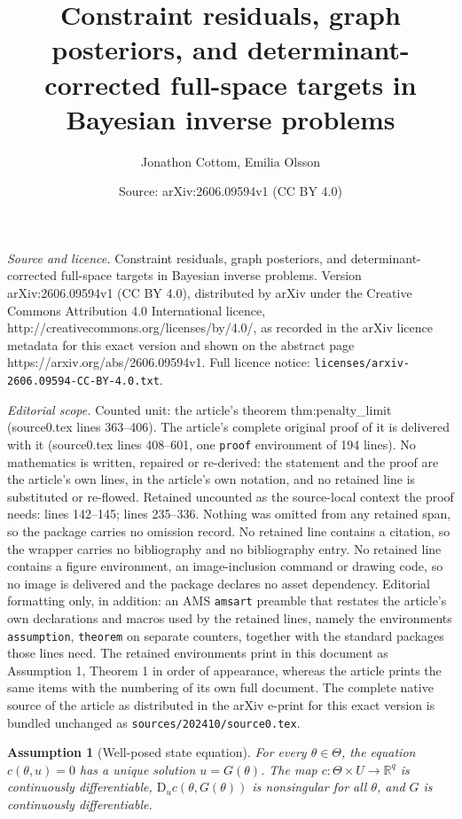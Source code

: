 \documentclass[10pt,a4paper]{amsart}
\title{Constraint residuals, graph posteriors, and determinant-corrected full-space targets in Bayesian inverse problems}
\author{Jonathon Cottom, Emilia Olsson}
\date{Source: arXiv:2606.09594v1 (CC BY 4.0)}
\newtheorem{assumption}{Assumption}
\newcommand{\D}{\mathrm{D}}
\newcommand{\R}{\mathbb{R}}
\begin{document}
\maketitle

\noindent\emph{Source and licence.} Constraint residuals, graph posteriors, and determinant-corrected full-space targets in Bayesian inverse problems. Version arXiv:2606.09594v1 (CC BY 4.0), distributed by arXiv under the Creative Commons Attribution 4.0 International licence, http://creativecommons.org/licenses/by/4.0/, as recorded in the arXiv licence metadata for this exact version and shown on the abstract page https://arxiv.org/abs/2606.09594v1. Full licence notice: \texttt{licenses/arxiv-2606.09594-CC-BY-4.0.txt}.\par\smallskip

\noindent\textit{Editorial scope.} Counted unit: the article's theorem thm:penalty\_limit (source0.tex lines 363--406). The article's complete original proof of it is delivered with it (source0.tex lines 408--601, one \texttt{proof} environment of 194 lines). No mathematics is written, repaired or re-derived: the statement and the proof are the article's own lines, in the article's own notation, and no retained line is substituted or re-flowed.  Retained uncounted as the source-local context the proof needs: lines 142--145; lines 235--336.  Nothing was omitted from any retained span, so the package carries no omission record.  No retained line contains a citation, so the wrapper carries no bibliography and no bibliography entry.  No retained line contains a figure environment, an image-inclusion command or drawing code, so no image is delivered and the package declares no asset dependency.  Editorial formatting only, in addition: an AMS \texttt{amsart} preamble that restates the article's own declarations and macros used by the retained lines, namely the environments \texttt{assumption}, \texttt{theorem} on separate counters, together with the standard packages those lines need.  The retained environments print in this document as Assumption 1, Theorem 1 in order of appearance, whereas the article prints the same items with the numbering of its own full document.  The complete native source of the article as distributed in the arXiv e-print for this exact version is bundled unchanged as \texttt{sources/202410/source0.tex}.
\begin{assumption}[Well-posed state equation]
\label{ass:state}
For every \(\theta\in\Theta\), the equation \(c(\theta,u)=0\) has a unique solution \(u=G(\theta)\). The map \(c:\Theta\times U\to\R^q\) is continuously differentiable, \(\D_u c(\theta,G(\theta))\) is nonsingular for all \(\theta\), and \(G\) is continuously differentiable.
\end{assumption}
\end{document}
